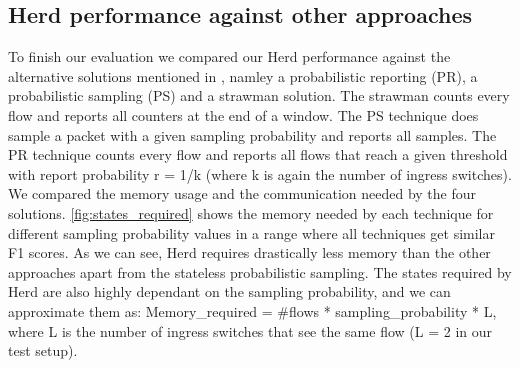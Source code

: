 \documentclass[11pt,oneside,a4paper]{article}
\begin{document}
\subsection{Herd performance against other approaches}

To finish our evaluation we compared our Herd performance against the alternative solutions mentioned in \cite{anon2019herd}, namley a probabilistic reporting (PR), a probabilistic sampling (PS) and a strawman solution. The strawman counts every flow and reports all counters at the end of a window. The PS technique does sample a packet with a given sampling probability and reports all samples. The PR technique counts every flow and reports all flows that reach a given threshold with report probability r = 1/k (where k is again the number of ingress switches). We compared the memory usage and the communication needed by the four solutions. \ref{fig:states_required} shows the memory needed by each technique for different sampling probability values in a range where all techniques get similar F1 scores. As we can see, Herd requires drastically less memory than the other approaches apart from the stateless probabilistic sampling. The states required by Herd are also highly dependant on the sampling probability, and we can approximate them as: Memory_required = #flows * sampling_probability * L, where L is the number of ingress switches that see the same flow (L = 2 in our test setup).
\end{document}
